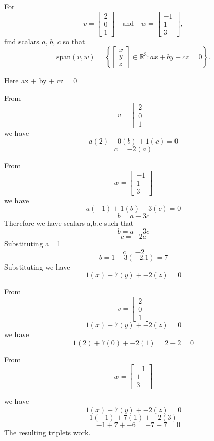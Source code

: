 For 
\[
v = 
\begin{bmatrix}
2 \\
0 \\
1
\end{bmatrix}
\quad \text{and} \quad
w = 
\begin{bmatrix}
-1 \\
1 \\
3
\end{bmatrix},
\]
find scalars $a$, $b$, $c$ so that
\[
\text{span}(v, w) = \left\{
\begin{bmatrix}
x \\
y \\
z
\end{bmatrix} \in \mathbb{R}^3 : ax + by + cz = 0
\right\}.
\]

Here 
ax + by + cz = 0

From \[
v = 
\begin{bmatrix}
2 \\
0 \\
1
\end{bmatrix}
\]
we have 
\[
a(2) + 0(b) + 1(c) = 0
\]
\[
c = -2(a)
\]

From \[
w = 
\begin{bmatrix}
-1 \\
1 \\
3
\end{bmatrix}
\]
we have 
\[
a(-1) + 1(b) + 3(c) = 0
\]
\[
b = a-3c
\]
Therefore we have scalars a,b,c such that 
\[
 b= a-3c
 \]
\[ c = -2a
\]
Substituting a =1
\[
c=-2
\]
\[
b = 1-3(-2.1) = 7
\]
Substituting we have 
\[
1(x) + 7(y) + -2(z) = 0
\]

From \[
v = 
\begin{bmatrix}
2 \\
0 \\
1
\end{bmatrix}
\]
\[
1(x) + 7(y) + -2(z) = 0
\]
we have 
\[
1(2) + 7(0) + -2(1) = 2 - 2 =0
\]


From \[
w = 
\begin{bmatrix}
-1 \\
1 \\
3
\end{bmatrix}
\]

we have
\[
1(x) + 7(y) + -2(z) = 0
\]
\[
1(-1) + 7(1) + -2(3) 
\]
\[
= -1 + 7 + -6 = -7 + 7 = 0
\]
The resulting triplets work.